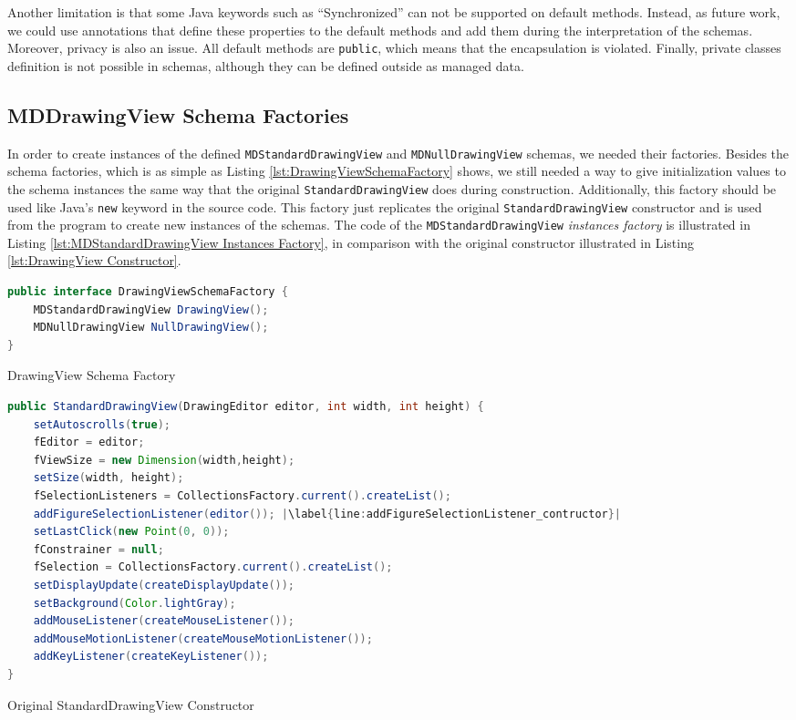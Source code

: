 Another limitation is that some Java keywords such as ``Synchronized'' can not be supported on default methods.
Instead, as future work, we could use annotations that define these properties to the default methods and add them during the interpretation of the schemas.
Moreover, privacy is also an issue.
All default methods are \texttt{public}, which means that the encapsulation is violated.
Finally, private classes definition is not possible in schemas, although they can be defined outside as managed data.

\subsection{MDDrawingView Schema Factories}
In order to create instances of the defined \texttt{MDStandardDrawingView} and \texttt{MDNullDrawingView} schemas, we needed their factories.
Besides the schema factories, which is as simple as Listing \ref{lst:DrawingViewSchemaFactory} shows, we still needed a way to give initialization values to the schema instances the same way that the original \texttt{StandardDrawingView} does during construction.
Additionally, this factory should be used like Java's \texttt{new} keyword in the source code.
This factory just replicates the original \texttt{StandardDrawingView} constructor and is used from the program to create new instances of the schemas.
The code of the \texttt{MDStandardDrawingView} \textit{instances factory} is illustrated in Listing \ref{lst:MDStandardDrawingView Instances Factory}, in comparison with the original constructor illustrated in Listing \ref{lst:DrawingView Constructor}.

\begin{sourcecode}[H]
	\begin{lstlisting}[language=Java, escapechar=|]
public interface DrawingViewSchemaFactory {
	MDStandardDrawingView DrawingView();
	MDNullDrawingView NullDrawingView();
}
	\end{lstlisting}
	\caption{DrawingView Schema Factory}
	\label{lst:DrawingViewSchemaFactory}
\end{sourcecode}

\begin{sourcecode}[H]
	\begin{lstlisting}[language=Java, escapechar=|]
public StandardDrawingView(DrawingEditor editor, int width, int height) {
	setAutoscrolls(true);
	fEditor = editor;
	fViewSize = new Dimension(width,height);
	setSize(width, height);
	fSelectionListeners = CollectionsFactory.current().createList();
	addFigureSelectionListener(editor()); |\label{line:addFigureSelectionListener_contructor}|
	setLastClick(new Point(0, 0));
	fConstrainer = null;
	fSelection = CollectionsFactory.current().createList();
	setDisplayUpdate(createDisplayUpdate());
	setBackground(Color.lightGray);
	addMouseListener(createMouseListener());
	addMouseMotionListener(createMouseMotionListener());
	addKeyListener(createKeyListener());
}
	\end{lstlisting}
	\label{lst:DrawingView Constructor}
	\caption{Original StandardDrawingView Constructor}
\end{sourcecode}

